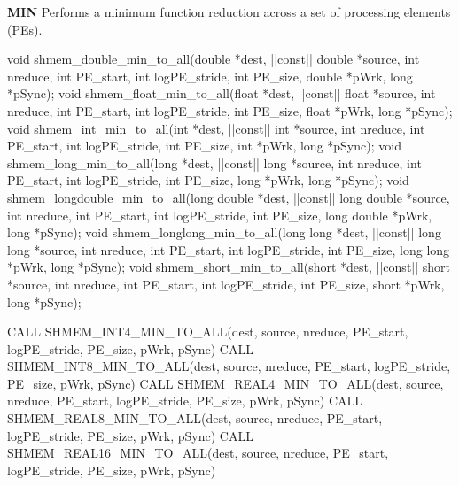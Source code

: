 \begin{apidefinition}
\bigskip
\textbf{MIN} \newline
Performs a minimum function reduction across a set of processing elements (\ac{PE}s).\newline
\begin{Csynopsis}
void shmem_double_min_to_all(double *dest, |\aftergroup{}|const|\aftergroup\prevcolor| double *source, int nreduce, int PE_start, int logPE_stride, int PE_size, double *pWrk, long *pSync);
void shmem_float_min_to_all(float *dest, |\aftergroup{}|const|\aftergroup\prevcolor| float *source, int nreduce, int PE_start, int logPE_stride, int PE_size, float *pWrk, long *pSync);
void shmem_int_min_to_all(int *dest, |\aftergroup{}|const|\aftergroup\prevcolor| int *source, int nreduce, int PE_start, int logPE_stride, int PE_size, int *pWrk, long *pSync);
void shmem_long_min_to_all(long *dest, |\aftergroup{}|const|\aftergroup\prevcolor| long *source, int nreduce, int PE_start, int logPE_stride, int PE_size, long *pWrk, long *pSync);
void shmem_longdouble_min_to_all(long double *dest, |\aftergroup{}|const|\aftergroup\prevcolor| long double *source, int nreduce, int PE_start, int logPE_stride, int PE_size, long double *pWrk, long *pSync);
void shmem_longlong_min_to_all(long long *dest, |\aftergroup{}|const|\aftergroup\prevcolor| long long *source, int nreduce, int PE_start, int logPE_stride, int PE_size, long long *pWrk, long *pSync);
void shmem_short_min_to_all(short *dest, |\aftergroup{}|const|\aftergroup\prevcolor| short *source, int nreduce, int PE_start, int logPE_stride, int PE_size, short *pWrk, long *pSync);
\end{Csynopsis}

\begin{Fsynopsis}
CALL SHMEM_INT4_MIN_TO_ALL(dest, source, nreduce, PE_start, logPE_stride, PE_size, pWrk, pSync)
CALL SHMEM_INT8_MIN_TO_ALL(dest, source, nreduce, PE_start, logPE_stride, PE_size, pWrk, pSync)
CALL SHMEM_REAL4_MIN_TO_ALL(dest, source, nreduce, PE_start, logPE_stride, PE_size, pWrk, pSync)
CALL SHMEM_REAL8_MIN_TO_ALL(dest, source, nreduce, PE_start, logPE_stride, PE_size, pWrk, pSync)
CALL SHMEM_REAL16_MIN_TO_ALL(dest, source, nreduce, PE_start, logPE_stride, PE_size, pWrk, pSync)
\end{Fsynopsis}


\end{apidefinition}
